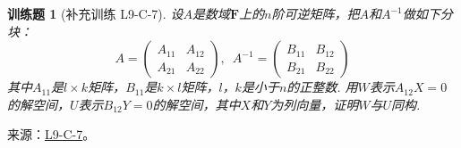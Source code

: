 \documentclass[UTF8,12pt,a4paper,fontset=fandol]{ctexart}
\newtheorem{exercise}{训练题}[section]
\begin{document}
\begin{exercise}[补充训练 L9-C-7]\label{prob:L9-C-7}
设$A$是数域$\mathbf{F}$上的$n$阶可逆矩阵，把$A$和$A^{-1}$做如下分块：
        \[A=\begin{pmatrix}
                A_{11} & A_{12} \\ A_{21} & A_{22}
            \end{pmatrix},\enspace A^{-1}=\begin{pmatrix}
                B_{11} & B_{12} \\ B_{21} & B_{22}
            \end{pmatrix}\]
        其中$A_{11}$是$l \times k$矩阵，$B_{11}$是$k \times l$矩阵，$l$，$k$是小于$n$的正整数. 用$W$表示$A_{12}X=0$的解空间，$U$表示$B_{12}Y=0$的解空间，其中$X$和$Y$为列向量，证明$W$与$U$同构.
\end{exercise}
\noindent 来源：\href{https://github.com/yhwu-is/Linear-Algebra-Left-Undone/blob/new/%E8%AE%B2%E4%B9%89/%E4%B8%93%E9%A2%98/9%20%E7%9F%A9%E9%98%B5%E8%BF%90%E7%AE%97%E8%BF%9B%E9%98%B6.tex}{L9-C-7}。
\end{document}
